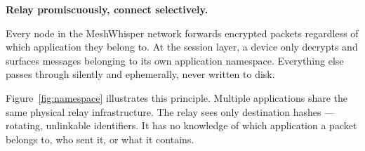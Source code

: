 \documentclass[11pt, a4paper]{article}
\begin{document}
\begin{pullquote}
\textbf{Relay promiscuously, connect selectively.}

Every node in the MeshWhisper network forwards encrypted packets regardless of which application they belong to. At the session layer, a device only decrypts and surfaces messages belonging to its own application namespace. Everything else passes through silently and ephemerally, never written to disk.
\end{pullquote}

Figure~\ref{fig:namespace} illustrates this principle. Multiple applications share the same physical relay infrastructure. The relay sees only destination hashes — rotating, unlinkable identifiers. It has no knowledge of which application a packet belongs to, who sent it, or what it contains.

\vspace{10pt}
\end{document}
